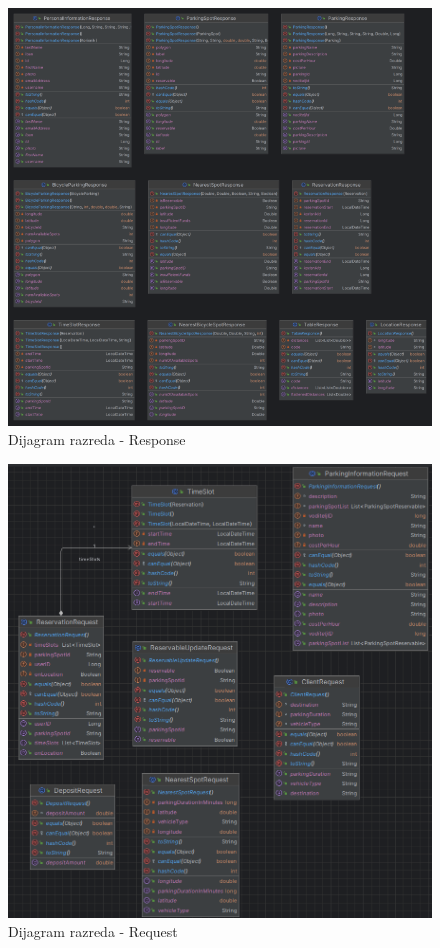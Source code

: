 \begin{figure}[H]
	\includegraphics[width=\textwidth]{slike/response.png} %
	\centering
	\caption{Dijagram razreda - Response}
	\label{fig:dijagramrazreda2}
\end{figure}

\begin{figure}[H]
	\includegraphics[width=\textwidth]{slike/request.png} %
	\centering
	\caption{Dijagram razreda - Request}
	\label{fig:dijagramrazreda2}
\end{figure}

